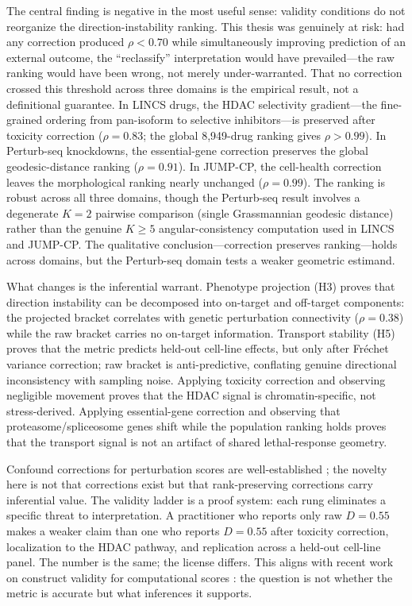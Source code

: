 \documentclass{article}
\begin{document}
The central finding is negative in the most useful sense: validity conditions
do not reorganize the direction-instability ranking. This thesis was
genuinely at risk: had any correction produced $\rho < 0.70$ while
simultaneously improving prediction of an external outcome, the
``reclassify'' interpretation would have prevailed---the raw ranking
would have been wrong, not merely under-warranted. That no correction
crossed this threshold across three domains is the empirical result,
not a definitional guarantee. In LINCS drugs, the
HDAC selectivity gradient---the fine-grained ordering from pan-isoform to
selective inhibitors---is preserved after toxicity correction ($\rho =
0.83$; the global 8{,}949-drug ranking gives $\rho > 0.99$). In Perturb-seq
knockdowns, the essential-gene correction preserves the global
geodesic-distance ranking ($\rho = 0.91$). In JUMP-CP, the cell-health
correction leaves the morphological ranking nearly unchanged ($\rho =
0.99$). The ranking is robust across all three domains, though the
Perturb-seq result involves a degenerate $K = 2$ pairwise comparison
(single Grassmannian geodesic distance) rather than the genuine $K \geq 5$
angular-consistency computation used in LINCS and JUMP-CP. The
qualitative conclusion---correction preserves ranking---holds across
domains, but the Perturb-seq domain tests a weaker geometric estimand.

What changes is the inferential warrant. Phenotype projection (H3) proves
that direction instability can be decomposed into on-target and off-target
components: the projected bracket correlates with genetic perturbation
connectivity ($\rho = 0.38$) while the raw bracket carries no on-target
information. Transport stability (H5) proves that the metric predicts
held-out cell-line effects, but only after Fr\'{e}chet variance correction;
raw bracket is anti-predictive, conflating genuine directional inconsistency
with sampling noise. Applying toxicity correction and
observing negligible movement proves that the HDAC signal is
chromatin-specific, not stress-derived. Applying essential-gene correction
and observing that proteasome/spliceosome genes shift while the population
ranking holds proves that the transport signal is not an artifact of shared
lethal-response geometry.

Confound corrections for perturbation scores are well-established
\citep{meyers2017ceres,pacini2021integrated}; the novelty here is not that
corrections exist but that rank-preserving corrections carry inferential
value. The validity ladder is a proof system: each rung eliminates a specific
threat to interpretation. A practitioner who reports only raw $D = 0.55$
makes a weaker claim than one who reports $D = 0.55$ after toxicity
correction, localization to the HDAC pathway, and replication across a
held-out cell-line panel. The number is the same; the license differs.
This aligns with recent work on construct validity for computational
scores \citep{freiesleben2025benchmarking,watson2025measuring}: the
question is not whether the metric is accurate but what inferences it
supports.
\end{document}
